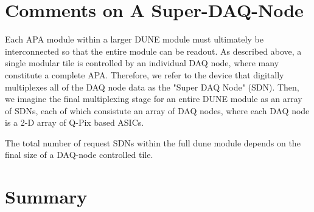 \section{Comments on A Super-DAQ-Node}

Each APA module within a larger DUNE module must ultimately be interconnected so that the entire module can be readout.
As described above, a single modular tile is controlled by an individual DAQ node, where many constitute a complete APA.
Therefore, we refer to the device that digitally multiplexes all of the DAQ node data as the "Super DAQ Node" (SDN).
Then, we imagine the final multiplexing stage for an entire DUNE module as an array of SDNs, each of which consistute an array of DAQ nodes, where each DAQ node is a 2-D array of Q-Pix based ASICs.

The total number of request SDNs within the full dune module depends on the final size of a DAQ-node controlled tile.

\section{Summary}